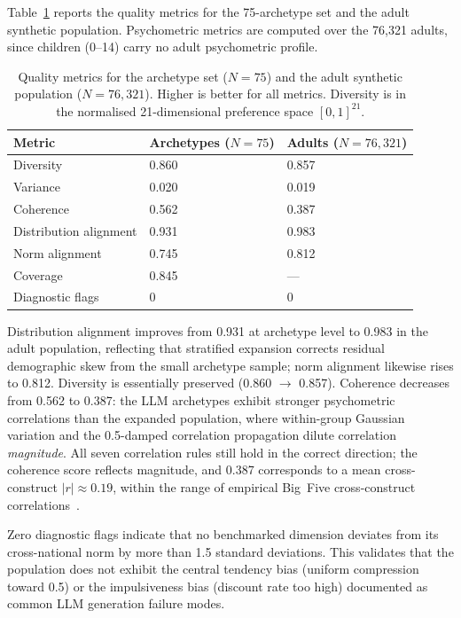 \documentclass[a4paper,12pt]{article}
\begin{document}
Table~\ref{tab:metrics} reports the quality metrics for the 75-archetype set
and the adult synthetic population. Psychometric metrics are computed over the
76{,}321 adults, since children (0--14) carry no adult psychometric profile.

\begin{table}[H]
\caption{Quality metrics for the archetype set ($N = 75$) and the adult
synthetic population ($N = 76{,}321$). Higher is better for all metrics.
Diversity is in the normalised 21-dimensional preference space $[0,1]^{21}$.}
\label{tab:metrics}
\begin{tabularx}{\textwidth}{lXX}
\toprule
\textbf{Metric}              & \textbf{Archetypes ($N=75$)} & \textbf{Adults ($N=76{,}321$)} \\
\midrule
Diversity                   & 0.860 & 0.857 \\
Variance                    & 0.020 & 0.019 \\
Coherence                   & 0.562 & 0.387 \\
Distribution alignment      & 0.931 & 0.983 \\
Norm alignment              & 0.745 & 0.812 \\
Coverage                    & 0.845 & --- \\
Diagnostic flags            & 0     & 0     \\
\bottomrule
\end{tabularx}
\end{table}

Distribution alignment improves from 0.931 at archetype level to 0.983 in the
adult population, reflecting that stratified expansion corrects residual demographic
skew from the small archetype sample; norm alignment likewise rises to 0.812.
Diversity is essentially preserved (0.860 $\to$ 0.857). Coherence decreases from
0.562 to 0.387: the LLM archetypes exhibit stronger psychometric correlations than
the expanded population, where within-group Gaussian variation and the 0.5-damped
correlation propagation dilute correlation \emph{magnitude}. All seven correlation
rules still hold in the correct direction; the coherence score reflects magnitude,
and 0.387 corresponds to a mean cross-construct $|r|\approx 0.19$, within the range of
empirical Big~Five cross-construct correlations~\cite{mccrae2003personality}.

Zero diagnostic flags indicate that no benchmarked dimension deviates
from its cross-national norm by more than 1.5 standard deviations. This
validates that the population does not exhibit the central tendency bias
(uniform compression toward 0.5) or the impulsiveness bias (discount rate
too high) documented as common LLM generation failure modes.
\end{document}
